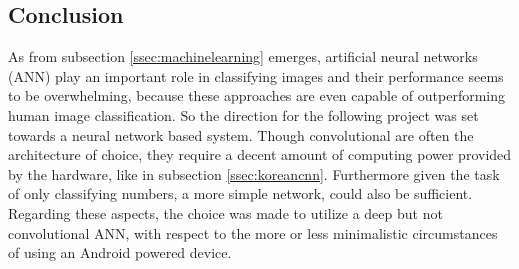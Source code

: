 \subsection{Conclusion}
As from subsection \ref{ssec:machinelearning} emerges, artificial neural networks (ANN) play an important role in classifying images and their performance seems to be overwhelming, because these approaches are even capable of outperforming human image classification. So the direction for the following project was set towards a neural network based system. Though convolutional are often the architecture of choice, they require a decent amount of computing power provided by the hardware, like in subsection \ref{ssec:koreancnn}. Furthermore given the task of only classifying numbers, a more simple network, could also be sufficient. Regarding these aspects, the choice was made to utilize a deep but not convolutional ANN, with respect to the more or less minimalistic circumstances of using an Android powered device.